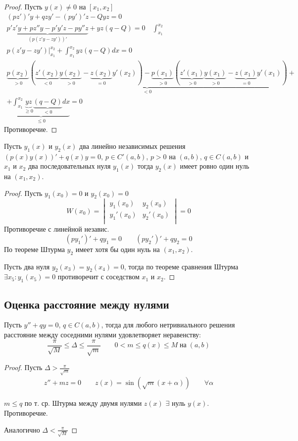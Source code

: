 \documentclass{article}
\begin{document}
\begin{proof}
  Пусть $y(x)\neq 0$ на $[x_1,x_2]$
  \begin{gather*}
    (pz')'y+qzy'-(py')'z-Qyz=0 \\ 
    \underbrace{p'z'y+pz''y-p'y'z-py''z}_{(p(z'y-zy'))'}+yz(q-Q) = 0 \quad \int_{x_1}^{x_2} \\ 
    p(z'y-zy')\big|_{x_1}^{x_2}+\int_{x_1}^{x_2}yz(q-Q)dx=0 \\ 
    \underbrace{\underbrace{p(x_2)}_{>0}(\underbrace{z'(x_2)}_{<0}\underbrace{y(x_2)}_{>0}-\underbrace{z(x_2)}_{=0}y'(x_2))-\underbrace{p(x_1)}_{>0}(\underbrace{z'(x_1)}_{>0}\underbrace{y(x_1)}_{>0}-\underbrace{z(x_1)}_{=0}y'(x_1))}_{<0}+ \\ 
    +\underbrace{\int_{x_1}^{x_2}\underbrace{yz}_{\ge0}\underbrace{(q-Q)}_{<0}dx}_{\le 0}=0
  \end{gather*}
  Противоречие.
\end{proof}
\begin{corollary}
  Пусть $y_1(x)$ и $y_2(x)$ два линейно независимых решения $(p(x)y(x))'+q(x)y=0$,
  $p\in C'(a,b)$, $p>0$ на $(a,b)$, $q\in C(a,b)$ и $x_1$ и $x_2$ два последовательных
  нуля $y_1(x)$ тогда $y_2(x)$ имеет ровно один нуль на $(x_1,x_2)$.
\end{corollary}
\begin{proof}
  Пусть $y_1(x_0)=0$ и $y_2(x_0)=0$
  \[
    W(x_0)=\begin{vmatrix}
      y_1(x_0) & y_2(x_0) \\
      y_1'(x_0) & y_2'(x_0) \\
    \end{vmatrix}=0
  \]
  Противоречие с линейной независ.
  \[
    (py_1')'+qy_1=0 \qquad (py_2')'+qy_2=0
  \]
  По теореме Штурма $y_2$ имеет хотя бы один нуль на $(x_1,x_2)$.
  
  Пусть два нуля $y_2(x_3)=y_2(x_4)=0$, тогда по теореме сравнения Штурма
  $\exists x_5: y_1(x_5)=0$ противоречит с соседством $x_1$ и $x_2$.
\end{proof}

\subsection{Оценка расстояние между нулями}
\begin{theorem}
  Пусть $y''+qy=0$, $q\in C(a,b)$,
  тогда для любого нетривиального решения расстояние между соседними нулями
  удовлетворяет неравенству:
  \[
    \frac{\pi}{\sqrt{M}} \le \Delta \le \frac{\pi}{\sqrt{m}} \qquad 0<m\le q(x) \le M \; \text{на} \; (a,b)
  \]
\end{theorem}
\begin{proof}
  Пусть $\Delta > \frac{\pi}{\sqrt{m}}$
  \begin{gather*}
    z''+mz=0 \qquad z(x)=\sin(\sqrt{m}(x+\alpha)) \qquad \forall \alpha
  \end{gather*}

  $m\le q$ по т. ср. Штурма между двумя нулями $z(x)$ $\exists$ нуль $y(x)$.
  Противоречие.

  Аналогично $\Delta<\frac{\pi}{\sqrt{M}}$
\end{proof}
\end{document}
